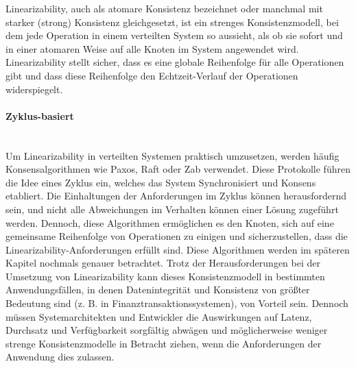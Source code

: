 \documentclass[../vs-script-first-v01.tex]{subfiles}
\begin{document}
Linearizability, auch als atomare Konsistenz bezeichnet oder manchmal mit starker (strong) Konsistenz gleichgesetzt, ist ein strenges Konsistenzmodell, bei dem jede Operation in einem verteilten System so aussieht, als ob sie sofort und in einer atomaren Weise auf alle Knoten im System angewendet wird. Linearizability stellt sicher, dass es eine globale Reihenfolge für alle Operationen gibt und dass diese Reihenfolge den Echtzeit-Verlauf der Operationen widerspiegelt.
\paragraph{Zyklus-basiert}\mbox{}\\
Um Linearizability in verteilten Systemen praktisch umzusetzen, werden häufig Konsensalgorithmen wie Paxos, Raft oder Zab verwendet. Diese Protokolle führen die Idee eines Zyklus ein, welches das System Synchronisiert und Konsens etabliert. Die Einhaltungen der Anforderungen im Zyklus können herausfordernd sein, und nicht alle Abweichungen im Verhalten können einer Lösung zugeführt werden. Dennoch, diese Algorithmen ermöglichen es den Knoten, sich auf eine gemeinsame Reihenfolge von Operationen zu einigen und sicherzustellen, dass die Linearizability-Anforderungen erfüllt sind. Diese Algorithmen werden im späteren Kapitel nochmals genauer betrachtet. Trotz der Herausforderungen bei der Umsetzung von Linearizability kann dieses Konsistenzmodell in bestimmten Anwendungsfällen, in denen Datenintegrität und Konsistenz von größter Bedeutung sind (z. B. in Finanztransaktionssystemen), von Vorteil sein. Dennoch müssen Systemarchitekten und Entwickler die Auswirkungen auf Latenz, Durchsatz und Verfügbarkeit sorgfältig abwägen und möglicherweise weniger strenge Konsistenzmodelle in Betracht ziehen, wenn die Anforderungen der Anwendung dies zulassen.
\end{document}
